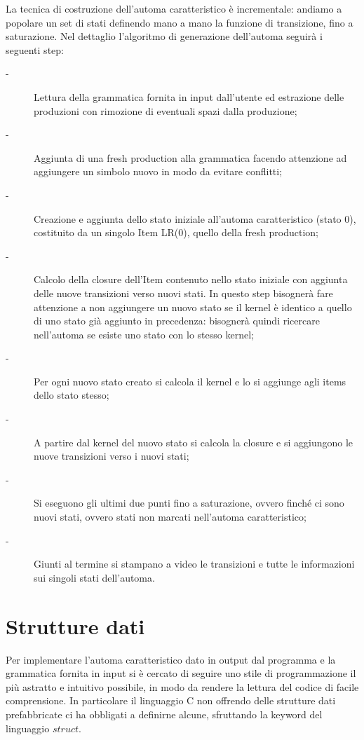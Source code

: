 \documentclass[12pt]{article}
\begin{document}
La tecnica di costruzione dell'automa caratteristico è incrementale: andiamo a popolare un set di stati definendo mano a mano la funzione di transizione, fino a saturazione. Nel dettaglio l'algoritmo di generazione dell'automa seguirà i seguenti step:
\begin{description}
\item[-] Lettura della grammatica fornita in input dall'utente ed estrazione delle produzioni con rimozione di eventuali spazi dalla produzione;
\item[-] Aggiunta di una fresh production alla grammatica facendo attenzione ad aggiungere un simbolo nuovo in modo da evitare conflitti;
\item[-] Creazione e aggiunta dello stato iniziale all'automa caratteristico (stato 0), costituito da un singolo Item LR(0), quello della fresh production;
\item[-] Calcolo della closure dell'Item contenuto nello stato iniziale con aggiunta delle nuove transizioni verso nuovi stati. In questo step bisognerà fare attenzione a non aggiungere un nuovo stato se il kernel è identico a quello di uno stato già aggiunto in precedenza: bisognerà quindi ricercare nell'automa se esiste uno stato con lo stesso kernel;
\item[-] Per ogni nuovo stato creato si calcola il kernel e lo si aggiunge agli items dello stato stesso;
\item[-] A partire dal kernel del nuovo stato si calcola la closure e si aggiungono le nuove transizioni verso i nuovi stati;
\item[-] Si eseguono gli ultimi due punti fino a saturazione, ovvero finché ci sono nuovi stati, ovvero stati non marcati nell'automa caratteristico;
\item[-] Giunti al termine si stampano a video le transizioni e tutte le informazioni sui singoli stati dell'automa.
\end{description}


\section{Strutture dati}
Per implementare l'automa caratteristico dato in output dal programma e la grammatica fornita in input si è cercato di seguire uno stile di programmazione il più astratto e intuitivo possibile, in modo da rendere la lettura del codice di facile comprensione. In particolare il linguaggio C non offrendo delle strutture dati prefabbricate ci ha obbligati a definirne alcune, sfruttando la keyword del linguaggio $struct$.\\
\end{document}
